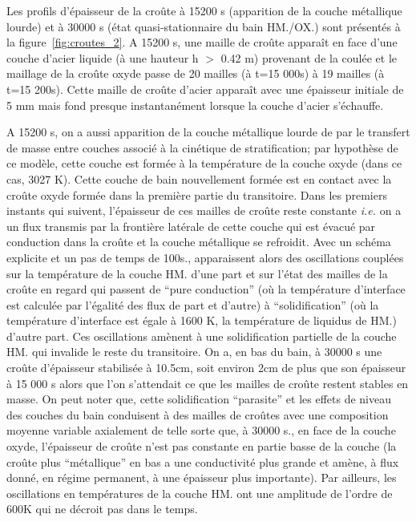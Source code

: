 Les profils d'épaisseur de la croûte à 15200 s (apparition de la couche métallique lourde) et à 30000 s (état quasi-stationnaire du bain HM./OX.) sont présentés à la figure~\ref{fig:croutes_2}.
A 15200 s, une maille de croûte apparaît en face d'une couche d'acier liquide (à une hauteur h $>$ 0.42 m) provenant de la coulée et le maillage de la croûte oxyde passe de 20 mailles (à t=15 000s) à 19 mailles (à t=15 200s). Cette maille de croûte d'acier apparaît avec une épaisseur initiale de 5 mm mais fond presque instantanément lorsque la couche d'acier s'échauffe. 

A 15200 s, on a aussi apparition de la couche métallique lourde de par le transfert de masse entre couches associé à la cinétique de stratification; par hypothèse de ce modèle, cette couche est formée à la température de la couche oxyde (dans ce cas, 3027 K). Cette couche de bain nouvellement formée est en contact avec la croûte oxyde formée dans la première partie du transitoire. Dans les premiers instants qui suivent, l'épaisseur de ces mailles de croûte reste constante \textit{i.e.} on a un flux transmis par la frontière latérale de cette couche qui est évacué par conduction dans la croûte et la couche métallique se refroidit. Avec un schéma explicite et un pas de temps de 100s., apparaissent alors des oscillations couplées sur la température de la couche HM. d'une part et sur l'état des mailles de la croûte en regard qui passent de ``pure conduction'' (où la température d'interface est calculée par l'égalité des flux de part et d'autre) à ``solidification'' (où la température d'interface est égale à 1600 K, la température de liquidus de HM.) d'autre part. Ces oscillations amènent à une solidification partielle de la couche HM. qui invalide le reste du transitoire. On a, en bas du bain, à 30000 s une croûte d'épaisseur stabilisée à 10.5cm, soit environ 2cm de plus que son épaisseur à 15 000 s alors que l'on s'attendait ce que les mailles de croûte restent stables en masse. On peut noter que, cette solidification ``parasite'' et les effets de niveau des couches du bain conduisent à des mailles de croûtes avec une composition moyenne variable axialement de telle sorte que, à 30000 s., en face de la couche oxyde, l'épaisseur de croûte n'est pas constante en partie basse de la couche (la croûte plus ``métallique'' en bas a une conductivité plus grande et amène, à flux donné, en régime permanent, à une épaisseur plus importante). Par ailleurs, les oscillations en températures de la couche HM. ont une amplitude de l'ordre de 600K qui ne décroit pas dans le temps.


